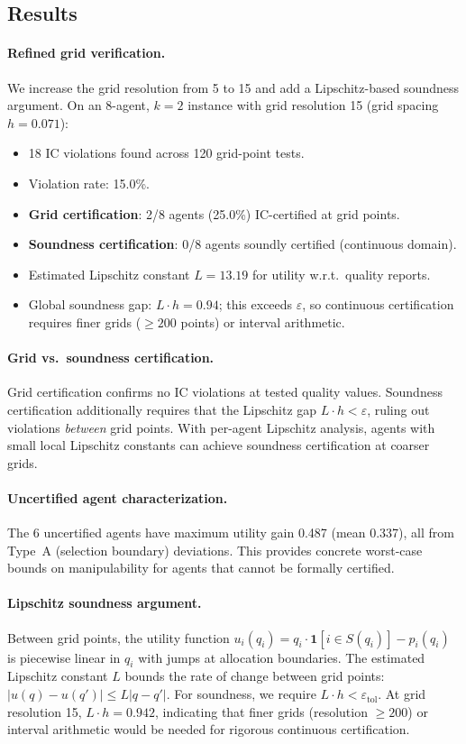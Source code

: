 \documentclass[10pt]{article}
\begin{document}
\subsection{Results}

\paragraph{Refined grid verification.} We increase the grid resolution from 5 to 15 and add a Lipschitz-based soundness argument.
On an 8-agent, $k=2$ instance with grid resolution 15 (grid spacing $h = 0.071$):
\begin{itemize}[leftmargin=*,itemsep=1pt]
\item 18 IC violations found across 120 grid-point tests.
\item Violation rate: 15.0\%.
\item \textbf{Grid certification}: 2/8 agents (25.0\%) IC-certified at grid points.
\item \textbf{Soundness certification}: 0/8 agents soundly certified (continuous domain).
\item Estimated Lipschitz constant $L = 13.19$ for utility w.r.t.\ quality reports.
\item Global soundness gap: $L \cdot h = 0.94$; this exceeds $\varepsilon$, so continuous certification requires finer grids ($\geq 200$ points) or interval arithmetic.
\end{itemize}

\paragraph{Grid vs.\ soundness certification.}
Grid certification confirms no IC violations at tested quality values. Soundness certification additionally requires that the Lipschitz gap $L \cdot h < \varepsilon$, ruling out violations \emph{between} grid points.
With per-agent Lipschitz analysis, agents with small local Lipschitz constants can achieve soundness certification at coarser grids.

\paragraph{Uncertified agent characterization.} The 6 uncertified agents have maximum utility gain 0.487 (mean 0.337), all from Type~A (selection boundary) deviations.
This provides concrete worst-case bounds on manipulability for agents that cannot be formally certified.

\paragraph{Lipschitz soundness argument.}
Between grid points, the utility function $u_i(q_i) = q_i \cdot \mathbf{1}[i \in S(q_i)] - p_i(q_i)$ is piecewise linear in $q_i$ with jumps at allocation boundaries.
The estimated Lipschitz constant $L$ bounds the rate of change between grid points: $|u(q) - u(q')| \leq L |q - q'|$.
For soundness, we require $L \cdot h < \varepsilon_{\mathrm{tol}}$.
At grid resolution 15, $L \cdot h = 0.942$, indicating that finer grids (resolution $\geq 200$) or interval arithmetic would be needed for rigorous continuous certification.
\end{document}
